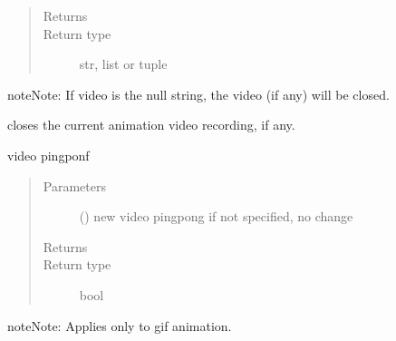 \documentclass[letterpaper,10pt,english]{sphinxmanual}
\begin{document}
\begin{fulllineitems}
\begin{fulllineitems}
\begin{quote}
\begin{description}
\item[{Returns}] \leavevmode
{}

\item[{Return type}] \leavevmode
str, list or tuple

\end{description}\end{quote}

\begin{sphinxadmonition}{note}{Note:}
If video is the null string, the video (if any) will be closed.
\end{sphinxadmonition}

\end{fulllineitems}


\begin{fulllineitems}
\label{\detokenize{Reference:salabim.Environment.video_close}}
closes the current animation video recording, if any.

\end{fulllineitems}


\begin{fulllineitems}
\label{\detokenize{Reference:salabim.Environment.video_pingpong}}
video pingponf
\begin{quote}\begin{description}
\item[{Parameters}] \leavevmode
{} () \textendash{} new video pingpong 
if not specified, no change

\item[{Returns}] \leavevmode
{}

\item[{Return type}] \leavevmode
bool

\end{description}\end{quote}

\begin{sphinxadmonition}{note}{Note:}
Applies only to gif animation.
\end{sphinxadmonition}


\end{fulllineitems}
\end{fulllineitems}
\end{document}
